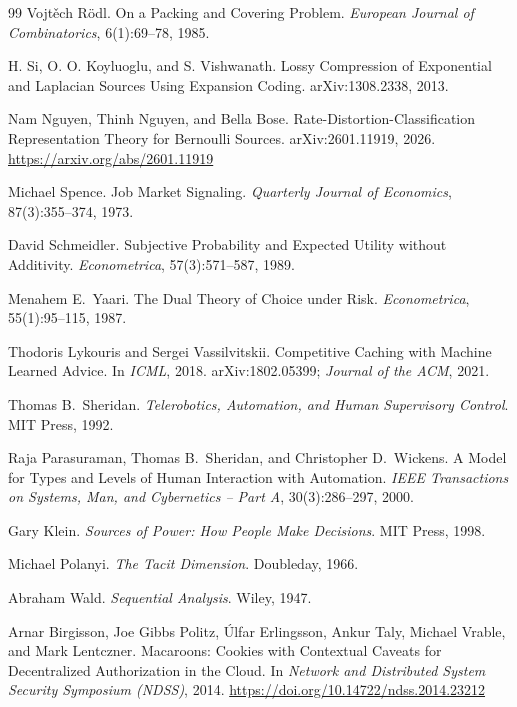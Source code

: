 \documentclass[11pt,a4paper]{article}
\theoremstyle{definition}
\theoremstyle{plain}
\begin{document}
\begin{thebibliography}{99}
Vojtěch Rödl.
\newblock On a Packing and Covering Problem.
\newblock \textit{European Journal of Combinatorics}, 6(1):69--78, 1985.

H. Si, O. O. Koyluoglu, and S. Vishwanath.
\newblock Lossy Compression of Exponential and Laplacian Sources Using Expansion Coding.
\newblock arXiv:1308.2338, 2013.

Nam Nguyen, Thinh Nguyen, and Bella Bose.
\newblock
Rate-Distortion-Classification Representation Theory for Bernoulli Sources.
\newblock arXiv:2601.11919, 2026.
\url{https://arxiv.org/abs/2601.11919}

Michael Spence.
\newblock Job Market Signaling.
\newblock \textit{Quarterly Journal of Economics}, 87(3):355--374, 1973.

David Schmeidler.
\newblock Subjective Probability and Expected Utility without Additivity.
\newblock \textit{Econometrica}, 57(3):571--587, 1989.

Menahem E.\ Yaari.
\newblock The Dual Theory of Choice under Risk.
\newblock \textit{Econometrica}, 55(1):95--115, 1987.

Thodoris Lykouris and Sergei Vassilvitskii.
\newblock Competitive Caching with Machine Learned Advice.
\newblock In \textit{ICML}, 2018. arXiv:1802.05399; \textit{Journal of the ACM}, 2021.

Thomas B.\ Sheridan.
\newblock \textit{Telerobotics, Automation, and Human Supervisory Control}.
\newblock MIT Press, 1992.

Raja Parasuraman, Thomas B.\ Sheridan, and Christopher D.\ Wickens.
\newblock A Model for Types and Levels of Human Interaction with Automation.
\newblock \textit{IEEE Transactions on Systems, Man, and Cybernetics -- Part A}, 30(3):286--297, 2000.

Gary Klein.
\newblock \textit{Sources of Power: How People Make Decisions}.
\newblock MIT Press, 1998.

Michael Polanyi.
\newblock \textit{The Tacit Dimension}.
\newblock Doubleday, 1966.

Abraham Wald.
\newblock \textit{Sequential Analysis}.
\newblock Wiley, 1947.

Arnar Birgisson, Joe Gibbs Politz, Úlfar Erlingsson, Ankur Taly, Michael Vrable, and Mark Lentczner.
\newblock Macaroons: Cookies with Contextual Caveats for Decentralized Authorization in the Cloud.
\newblock In \textit{Network and Distributed System Security Symposium (NDSS)}, 2014.
\newblock \url{https://doi.org/10.14722/ndss.2014.23212}


\end{thebibliography}
\end{document}
